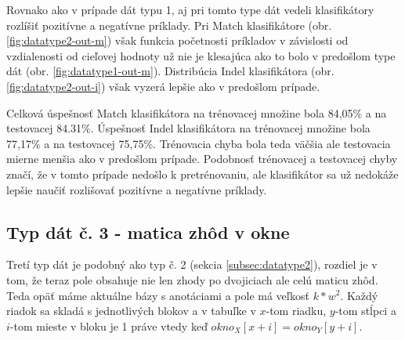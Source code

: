 Rovnako ako v prípade dát typu 1, aj pri tomto type dát vedeli klasifikátory rozlíšiť pozitívne a negatívne príklady.
Pri Match klasifikátore (obr. \ref{fig:datatype2-out-m}) však funkcia početnosti príkladov v závislosti od vzdialenosti od cieľovej hodnoty už nie je klesajúca ako to bolo v predošlom type dát (obr. \ref{fig:datatype1-out-m}).
Distribúcia Indel klasifikátora (obr. \ref{fig:datatype2-out-i}) však vyzerá lepšie ako v predošlom prípade.

Celková úspešnosť Match klasifikátora na trénovacej množine bola 84,05\% a na testovacej 84.31\%.
Úspešnosť Indel klasifikátora na trénovacej množine bola 77,17\% a na testovacej 75,75\%.
Trénovacia chyba bola teda väčšia ale testovacia mierne menšia ako v predošlom prípade.
Podobnosť trénovacej a testovacej chyby značí, že v tomto prípade nedošlo k pretrénovaniu, ale klasifikátor sa už nedokáže lepšie naučiť rozlišovať pozitívne a negatívne príklady.

\subsection{Typ dát č. 3 - matica zhôd v okne}

Tretí typ dát je podobný ako typ č. 2 (sekcia \ref{subsec:datatype2}), rozdiel je v tom, že teraz pole obsahuje nie len zhody po dvojiciach ale celú maticu zhôd. Teda opäť máme aktuálne bázy s anotáciami a pole má veľkosť $k*w^2$. Každý riadok sa skladá s jednotlivých blokov a v tabuľke v $x$-tom riadku, $y$-tom stĺpci a $i$-tom mieste v bloku je 1 práve
vtedy keď $okno_X[x+i] = okno_Y[y+i]$.

